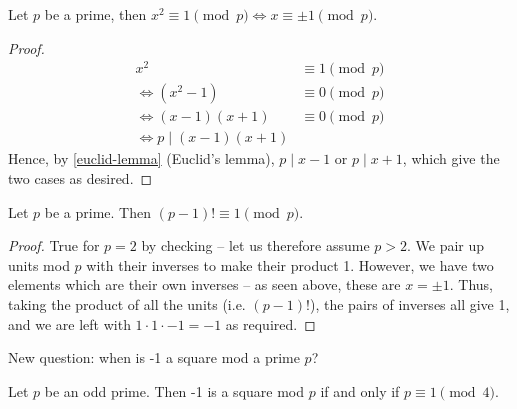 \documentclass{../../template/note}
\begin{document}
    \begin{lemma}
        Let \(p\) be a prime, then \(x^2 \equiv 1 \pmod p \iff x \equiv \pm 1 \pmod p\).
    \end{lemma}
    
    \begin{proof}
        \begin{align*}
            x^2 &\equiv 1 \pmod p \\
            \iff (x^2-1) &\equiv 0 \pmod p \\
            \iff (x-1)(x+1) &\equiv 0 \pmod p \\
            \iff p \mid (x-1)(x+1)
        \end{align*}
        Hence, by \cref{euclid-lemma} (Euclid's lemma), \(p \mid x-1\) or \(p \mid x+1\), which give the two cases as desired.
    \end{proof}
    

    \begin{theorem}[Wilson]
        Let \(p\) be a prime. Then \((p-1)! \equiv 1 \pmod p\).
    \end{theorem}
    
    \begin{proof}
        True for \(p = 2\) by checking -- let us therefore assume \(p > 2\). We pair up units mod \(p\) with their inverses to make their product 1. However, we have two elements which are their own inverses -- as seen above, these are \(x = \pm 1\). Thus, taking the product of all the units (i.e. \((p-1)!\)), the pairs of inverses all give 1, and we are left with \(1 \cdot 1 \cdot -1 = -1\) as required.
    \end{proof}
    
    New question: when is -1 a square mod a prime \(p\)?

    \begin{proposition}
        Let \(p\) be an odd prime. Then -1 is a square mod \(p\) if and only if \(p \equiv 1 \pmod 4\).
    \end{proposition}
    
\end{document}
